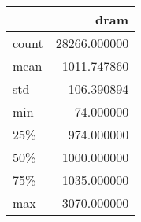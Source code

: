\begin{tabular}{lr}
\toprule
{} &          dram \\
\midrule
count &  28266.000000 \\
mean  &   1011.747860 \\
std   &    106.390894 \\
min   &     74.000000 \\
25\%   &    974.000000 \\
50\%   &   1000.000000 \\
75\%   &   1035.000000 \\
max   &   3070.000000 \\
\bottomrule
\end{tabular}

